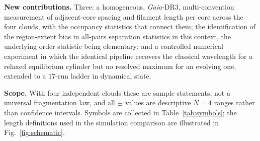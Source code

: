 \documentclass[usenatbib,twoside,twocolumn]{mnras}
\begin{document}
\smallskip\noindent\textbf{New contributions.} Three: a homogeneous, \textit{Gaia}-DR3, multi-convention measurement of adjacent-core spacing and filament length per core across the four clouds, with the occupancy statistics that connect them; the identification of the region-extent bias in all-pairs separation statistics in this context, the underlying order statistic being elementary; and a controlled numerical experiment in which the identical pipeline recovers the classical wavelength for a relaxed equilibrium cylinder but no resolved maximum for an evolving one, extended to a $17$-run ladder in dynamical state.

\smallskip\noindent\textbf{Scope.} With four independent clouds these are sample statements, not a universal fragmentation law, and all $\pm$ values are descriptive $N=4$ ranges rather than confidence intervals. Symbols are collected in Table~\ref{tab:symbols}; the length definitions used in the simulation comparison are illustrated in Fig.~\ref{fig:schematic}.
\end{document}
